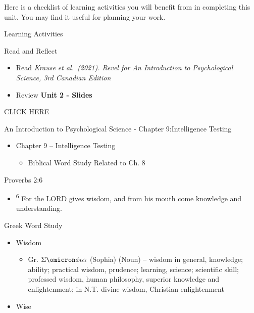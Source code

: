\documentclass[
]{book}
\providecommand{\tightlist}{%
  \setlength{\itemsep}{0pt}\setlength{\parskip}{0pt}}
\begin{document}
Here is a checklist of learning activities you will benefit from in completing this unit. You may find it useful for planning your work.

\begin{reflect}
{Learning Activities}

{Read and Reflect}

\begin{itemize}
\tightlist
\item
  Read \emph{Krause et al.~(2021). Revel for An Introduction to Psychological Science, 3rd Canadian Edition}\\
\item
  Review \textbf{Unit 2 - Slides}
\end{itemize}

CLICK HERE

An Introduction to Psychological Science - Chapter 9:Intelligence Testing

\begin{itemize}
\tightlist
\item
  Chapter 9 -- Intelligence Testing

  \begin{itemize}
  \tightlist
  \item
    Biblical Word Study Related to Ch. 8
  \end{itemize}
\end{itemize}

Proverbs 2:6

\begin{itemize}
\item
  \textsuperscript{6} For the LORD gives wisdom, and from his mouth come knowledge and understanding.
\end{itemize}

Greek Word Study

\begin{itemize}
\tightlist
\item
  Wisdom

  \begin{itemize}
  \tightlist
  \item
    Gr. \(\Sigma\omicron\phi\iota\alpha\) (Sophia) (Noun) -- wisdom in general, knowledge; ability; practical wisdom, prudence; learning, science; scientific skill; professed wisdom, human philosophy, superior knowledge and enlightenment; in N.T. divine wisdom, Christian enlightenment\\
  \end{itemize}
\item
  Wise


\end{itemize}
\end{reflect}
\end{document}
